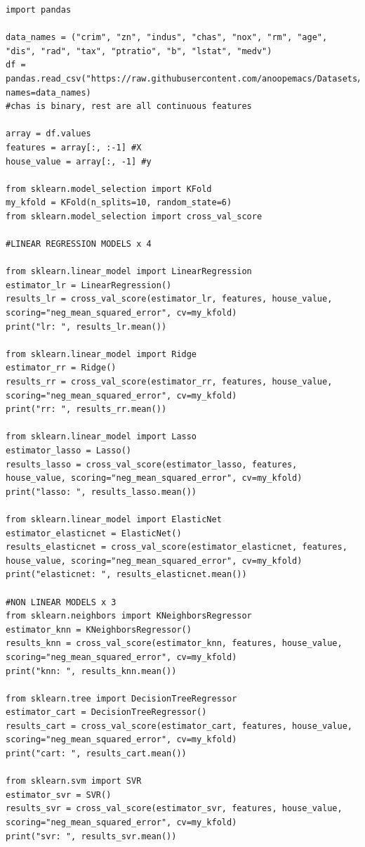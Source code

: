 \documentclass[11pt]{article}
\begin{document}
\begin{verbatim}
import pandas

data_names = ("crim", "zn", "indus", "chas", "nox", "rm", "age", "dis", "rad", "tax", "ptratio", "b", "lstat", "medv")
df = pandas.read_csv("https://raw.githubusercontent.com/anoopemacs/Datasets/master/housing.csv", names=data_names)
#chas is binary, rest are all continuous features

array = df.values
features = array[:, :-1] #X
house_value = array[:, -1] #y

from sklearn.model_selection import KFold
my_kfold = KFold(n_splits=10, random_state=6)
from sklearn.model_selection import cross_val_score

#LINEAR REGRESSION MODELS x 4

from sklearn.linear_model import LinearRegression
estimator_lr = LinearRegression()
results_lr = cross_val_score(estimator_lr, features, house_value, scoring="neg_mean_squared_error", cv=my_kfold)
print("lr: ", results_lr.mean())

from sklearn.linear_model import Ridge
estimator_rr = Ridge()
results_rr = cross_val_score(estimator_rr, features, house_value, scoring="neg_mean_squared_error", cv=my_kfold)
print("rr: ", results_rr.mean())

from sklearn.linear_model import Lasso
estimator_lasso = Lasso()
results_lasso = cross_val_score(estimator_lasso, features, house_value, scoring="neg_mean_squared_error", cv=my_kfold)
print("lasso: ", results_lasso.mean())

from sklearn.linear_model import ElasticNet
estimator_elasticnet = ElasticNet()
results_elasticnet = cross_val_score(estimator_elasticnet, features, house_value, scoring="neg_mean_squared_error", cv=my_kfold)
print("elasticnet: ", results_elasticnet.mean())

#NON LINEAR MODELS x 3
from sklearn.neighbors import KNeighborsRegressor
estimator_knn = KNeighborsRegressor()
results_knn = cross_val_score(estimator_knn, features, house_value, scoring="neg_mean_squared_error", cv=my_kfold)
print("knn: ", results_knn.mean())

from sklearn.tree import DecisionTreeRegressor
estimator_cart = DecisionTreeRegressor()
results_cart = cross_val_score(estimator_cart, features, house_value, scoring="neg_mean_squared_error", cv=my_kfold)
print("cart: ", results_cart.mean())

from sklearn.svm import SVR
estimator_svr = SVR()
results_svr = cross_val_score(estimator_svr, features, house_value, scoring="neg_mean_squared_error", cv=my_kfold)
print("svr: ", results_svr.mean())
\end{verbatim}
\end{document}
